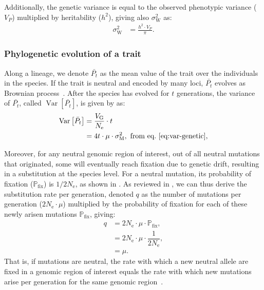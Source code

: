 \documentclass{article}
\newcommand{\Multiply}{\cdot}
\DeclareMathOperator{\Var}{\text{Var}}
\newcommand{\Ne}{N_{\text{e}}}
\newcommand{\proba}{\mathbb{P}}
\newcommand{\pfix}{\proba_{\text{fix}}}
\newcommand{\Time}{t}
\newcommand{\Trait}{P}
\newcommand{\Heredity}{h^2}
\newcommand{\MeanTrait}{\bar{\Trait_{\Time}}}
\newcommand{\VarPhy}{\Var \left[\MeanTrait\right]}
\newcommand{\MutationRate}{\mu}
\newcommand{\SubRate}{q}
\newcommand{\VarPhenotype}{V_{\Trait}}
\newcommand{\VarGenetic}{V_{\mathrm{G}}}
\newcommand{\RateMut}{\sigma^2_{\mathrm{M}}}
\newcommand{\RatePop}{\sigma^2_{\mathrm{W}}}
\begin{document}
Additionally, the genetic variance is equal to the observed phenotypic variance ($\VarPhenotype$) multiplied by heritability ($\Heredity$), giving also $\RatePop$ as:
\begin{align}
    \RatePop & = \frac{\Heredity \Multiply \VarPhenotype }{\pi }. \label{eq:rate-pheno-pop}
\end{align}

\subsubsection*{Phylogenetic evolution of a trait}

Along a lineage, we denote $\MeanTrait$ as the mean value of the trait over the individuals in the species.
If the trait is neutral and encoded by many loci, $\MeanTrait$ evolves as Brownian process~\cite{hansen_translating_1996}.
After the species has evolved for $\Time$ generations, the variance of $\MeanTrait$, called $\VarPhy$, is given by \textcite{hansen_translating_1996} as:
\begin{align}
    \VarPhy & = \frac{\VarGenetic}{\Ne} \Multiply \Time \\
    & = 4 \Time \Multiply \MutationRate \Multiply \RateMut \label{eq:covar},\text{ from eq.~\ref{eq:var-genetic}},
\end{align}

Moreover, for any neutral genomic region of interest, out of all neutral mutations that originated, some will eventually reach fixation due to genetic drift, resulting in a substitution at the species level.
For a neutral mutation, its probability of fixation ($\pfix$) is $1/2\Ne$, as shown in \textcite{kimura_probability_1962}.
As reviewed in \textcite{mccandlish_modeling_2014}, we can thus derive the substitution rate per generation, denoted $\SubRate$ as the number of mutations per generation ($2\Ne \Multiply \MutationRate$) multiplied by the probability of fixation for each of these newly arisen mutations $\pfix$, giving:
\begin{align}
    \SubRate & = 2 \Ne \Multiply \MutationRate \Multiply \pfix, \\
    & = 2 \Ne  \Multiply \MutationRate  \Multiply \dfrac{1}{2\Ne}, \\
    & = \MutationRate. \label{eq:substitution-rate}
\end{align}
That is, if mutations are neutral, the rate with which a new neutral allele are fixed in a genomic region of interest equals the rate with which new mutations arise per generation for the same genomic region~\cite{kimura_evolutionary_1968}.
\end{document}
